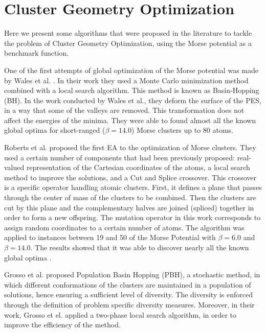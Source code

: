 	\pagebreak
			
	\section{Cluster Geometry Optimization}
		\label{subsec:cgo}
		Here we present some algorithms that were proposed in the literature to tackle the problem of Cluster Geometry Optimization, using the Morse potential as a benchmark function.

		One of the first attempts of global optimization of the Morse potential was made by Wales et al. \cite{wales97, doye97}. In their work they used a Monte Carlo minimization method \cite{li87} combined with a local search algorithm. This method is known as Basin-Hopping (BH). In the work conducted by Wales et al., they deform the surface of the PES, in a way that some of the valleys are removed. This transformation does not affect the energies of the minima. They were able to found almost all the known global optima for short-ranged ($\beta = 14.0$) Morse clusters up to 80 atoms.
		
		Roberts et al. \cite{roberts00} proposed the first EA to the optimization of Morse clusters. They used a certain number of components that had been previously proposed: real-valued representation of the Cartesian coordinates of the atoms, a local search method to improve the solutions, and a Cut and Splice \cite{deaven95} crossover. This crossover is a specific operator handling atomic clusters. First, it defines a plane that passes through the center of mass of the clusters to be combined. Then the clusters are cut by this plane and the complementary halves are joined (spliced) together in order to form a new offspring.
		The mutation operator in this work corresponds to assign random coordinates to a certain number of atoms. 
		The algorithm was applied to instances between 19 and 50 of the Morse Potential with $\beta = 6.0$ and $\beta = 14.0$. The results showed that it was able to discover nearly all the known global optima \cite{roberts00}.   
		
		Grosso et al. \cite{grosso07} proposed Population Basin Hopping (PBH), a stochastic method, in which different conformations of the clusters are maintained in a population of solutions, hence ensuring a sufficient level of diversity. The diversity is enforced through the definition of problem specific diversity measures. Moreover, in their work, Grosso et el. applied a two-phase local search algorithm, in order to improve the efficiency of the method.
		
